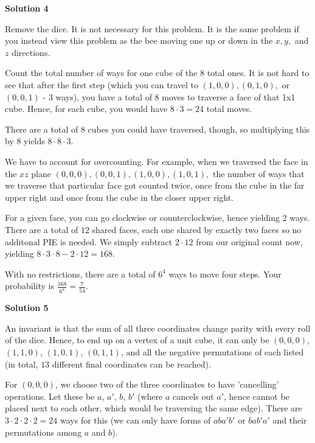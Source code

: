 \begin{enumerate}
 



\textbf{Solution 4}

Remove the dice. It is not necessary for this problem. It is the same problem if you instead view this problem as the bee moving one up or down in the $x, y,$ and $z$ directions.

 Count the total number of ways for one cube of the 8 total ones. It is not hard to see that after the first step (which you can travel to $(1,0,0), (0,1,0),$ or $(0,0,1)$ -  3 ways), you have a total of 8 moves to traverse a face of that 1x1 cube. Hence, for each cube, you would have $8 \cdot 3 = 24$ total moves.

 There are a total of 8 cubes you could have traversed, though, so multiplying this by $8$ yields $8 \cdot 8 \cdot 3.$

 We have to account for overcounting. For example, when we traversed the face in the $xz$ plane $(0,0,0), (0,0,1),(1,0,0),(1,0,1),$ the number of ways that we traverse that particular face got counted twice, once from the cube in the far upper right and once from the cube in the closer upper right.

 For a given face, you can go clockwise or counterclockwise, hence yielding $2$ ways. There are a total of $12$ shared faces, each one shared by exactly two faces so no additonal PIE is needed. We simply subtract $2\cdot12$ from our original count now, yielding $8 \cdot 3 \cdot 8 - 2 \cdot 12 = 168.$ 

 With no restrictions, there are a total of $6^4$ ways to move four steps. Your probability is $\frac{168}{6^4}=\frac{7}{54}.$




\textbf{Solution 5}

An invariant is that the sum of all three coordinates change parity with every roll of the dice. Hence, to end up on a vertex of a unit cube, it can only be $(0,0,0)$, $(1,1,0)$, $(1,0,1)$, $(0,1,1)$, and all the negative permutations of each listed (in total, $13$ different final coordinates can be reached).

 For $(0,0,0)$, we choose two of the three coordinates to have 'cancelling' operations. Let these be $a$, $a'$, $b$, $b'$ (where $a$ cancels out $a'$, hence cannot be placed next to each other, which would be traversing the same edge). There are $3\cdot2\cdot2\cdot2=24$ ways for this (we can only have forms of $aba'b'$ or $bab'a'$ and their permutations among $a$ and $b$).


\end{enumerate}
